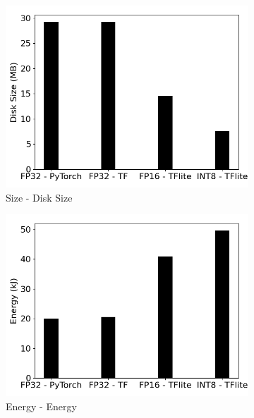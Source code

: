 \begin{figure}[]
\begin{subfigure}{0.19\textwidth}
        \includegraphics[width=1\textwidth]{other/figures/YOLOv5s_COCO_Laptop/Size.png}
        \caption{Size - Disk Size}
    \end{subfigure}
    \begin{subfigure}{0.19\textwidth}
        \includegraphics[width=1\textwidth]{other/figures/YOLOv5s_COCO_Laptop/Energy.png}
        \caption{Energy - Energy}
    \end{subfigure}
    \begin{subfigure}{0.19\textwidth}

\end{subfigure}
\end{figure}
